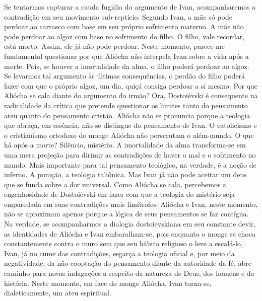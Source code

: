 Se tentarmos capturar a cauda fugidia do argumento de Ivan,
acompanharemos a contradição em seu movimento sub-reptício. Segundo
Ivan, a mãe só pode perdoar ao carrasco com base em seu próprio
sofrimento materno. A mãe não pode perdoar ao algoz com base no
sofrimento do filho. O filho, vale recordar, está morto. Assim, ele já
não pode perdoar. Neste momento, parece-me fundamental questionar por
que Aliócha não interpela Ivan sobre a vida após a morte. Pois, se
houver a imortalidade da alma, o filho poderá perdoar ao algoz. Se
levarmos tal argumento às últimas consequências, o perdão do filho
poderá fazer com que o próprio algoz, um dia, quiçá consiga perdoar a si
mesmo. Por que Aliócha se cala diante do argumento do irmão? Ora,
Dostoiévski é consequente na radicalidade da crítica que pretende
questionar os limites tanto do pensamento ateu quanto do pensamento
cristão. Aliócha não se pronuncia porque a teologia que abraça, em
essência, não se distingue do pensamento de Ivan. O catolicismo e o
cristianismo ortodoxo do monge Aliócha não perscrutam o além-mundo. O
que há após a morte? Silêncio, mistério. A imortalidade da alma
transforma-se em uma mera projeção para dirimir as contradições de haver
o mal e o sofrimento no mundo. Mais importante para tal pensamento
teológico, na verdade, é a noção de inferno. A punição, a teologia
taliônica. Mas Ivan já não pode aceitar um deus que se funda sobre a dor
universal. Como Aliócha se cala, percebemos a engenhosidade de
Dostoiévski em fazer com que a teologia do mistério seja emparedada em
suas contradições mais limítrofes. Aliócha e Ivan, neste momento, não se
aproximam apenas porque a lógica de seus pensamentos se faz contígua. Na
verdade, se acompanharmos a dialogia dostoievskiana em seu constante
devir, as identidades de Aliócha e Ivan embaralham-se, pois enquanto o
monge se choca constantemente contra o muro sem que seu hábito religioso
o leve a escalá-lo, Ivan, já no cume das contradições, esgarça a
teologia oficial e, por meio da negatividade, da não-cooptação do
pensamento diante da autoridade da fé, abre caminho para novas
indagações a respeito da natureza de Deus, dos homens e da história.
Neste momento, em face do monge Aliócha, Ivan torna-se, dialeticamente,
um ateu espiritual.

